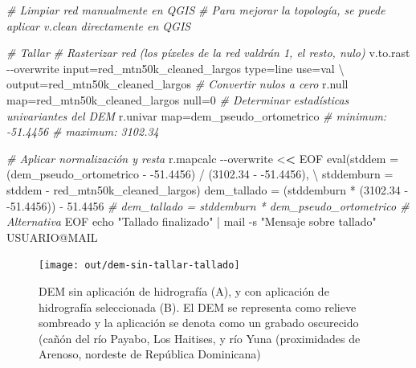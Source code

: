 \documentclass[spanish]{article}
\newenvironment{Shaded}{\begin{snugshade}}{\end{snugshade}}
\newcommand{\AttributeTok}[1]{\textcolor[rgb]{0.77,0.63,0.00}{#1}}
\newcommand{\CommentTok}[1]{\textcolor[rgb]{0.56,0.35,0.01}{\textit{#1}}}
\newcommand{\DecValTok}[1]{\textcolor[rgb]{0.00,0.00,0.81}{#1}}
\newcommand{\ErrorTok}[1]{\textcolor[rgb]{0.64,0.00,0.00}{\textbf{#1}}}
\newcommand{\FloatTok}[1]{\textcolor[rgb]{0.00,0.00,0.81}{#1}}
\newcommand{\FunctionTok}[1]{\textcolor[rgb]{0.00,0.00,0.00}{#1}}
\newcommand{\NormalTok}[1]{#1}
\newcommand{\OtherTok}[1]{\textcolor[rgb]{0.56,0.35,0.01}{#1}}
\newcommand{\SpecialCharTok}[1]{\textcolor[rgb]{0.00,0.00,0.00}{#1}}
\newcommand{\StringTok}[1]{\textcolor[rgb]{0.31,0.60,0.02}{#1}}
\begin{document}
\begin{Shaded}
\begin{Highlighting}[]
\CommentTok{\# Limpiar red manualmente en QGIS}
\CommentTok{\# Para mejorar la topología, se puede aplicar v.clean directamente en QGIS}

\CommentTok{\# Tallar}
\CommentTok{\# Rasterizar red (los píxeles de la red valdrán 1, el resto, nulo)}
\NormalTok{v.to.rast }\SpecialCharTok{{-}{-}}\NormalTok{overwrite input}\OtherTok{=}\NormalTok{red\_mtn50k\_cleaned\_largos type}\OtherTok{=}\NormalTok{line use}\OtherTok{=}\NormalTok{val \textbackslash{}}
\NormalTok{  output}\OtherTok{=}\NormalTok{red\_mtn50k\_cleaned\_largos}
\CommentTok{\# Convertir nulos a cero}
\NormalTok{r.null map}\OtherTok{=}\NormalTok{red\_mtn50k\_cleaned\_largos null}\OtherTok{=}\DecValTok{0}
\CommentTok{\# Determinar estadísticas univariantes del DEM}
\NormalTok{r.univar map}\OtherTok{=}\NormalTok{dem\_pseudo\_ortometrico}
\CommentTok{\# minimum: {-}51.4456}
\CommentTok{\# maximum: 3102.34}

\CommentTok{\# Aplicar normalización y resta}
\NormalTok{r.mapcalc }\SpecialCharTok{{-}{-}}\NormalTok{overwrite }\SpecialCharTok{\textless{}}\ErrorTok{\textless{}}\NormalTok{ EOF}
\FunctionTok{eval}\NormalTok{(}\AttributeTok{stddem =}\NormalTok{ (dem\_pseudo\_ortometrico }\SpecialCharTok{{-}} \SpecialCharTok{{-}}\FloatTok{51.4456}\NormalTok{) }\SpecialCharTok{/}\NormalTok{ (}\FloatTok{3102.34} \SpecialCharTok{{-}} \SpecialCharTok{{-}}\FloatTok{51.4456}\NormalTok{), }\SpecialCharTok{\textbackslash{}}
     \AttributeTok{stddemburn =}\NormalTok{ stddem }\SpecialCharTok{{-}}\NormalTok{ red\_mtn50k\_cleaned\_largos)}
\NormalTok{dem\_tallado }\OtherTok{=}\NormalTok{ (stddemburn }\SpecialCharTok{*}\NormalTok{ (}\FloatTok{3102.34} \SpecialCharTok{{-}} \SpecialCharTok{{-}}\FloatTok{51.4456}\NormalTok{)) }\SpecialCharTok{{-}} \FloatTok{51.4456}
\CommentTok{\# dem\_tallado = stddemburn * dem\_pseudo\_ortometrico \# Alternativa}
\NormalTok{EOF}
\NormalTok{echo }\StringTok{"Tallado finalizado"} \SpecialCharTok{|}\NormalTok{ mail }\SpecialCharTok{{-}}\NormalTok{s }\StringTok{"Mensaje sobre tallado"}\NormalTok{ USUARIO}\SpecialCharTok{@}\NormalTok{MAIL}
\end{Highlighting}
\end{Shaded}

\begin{figure}

{\centering \texttt{[image: out/dem-sin-tallar-tallado]} 

}

\caption{DEM sin aplicación de hidrografía (A), y con aplicación de hidrografía seleccionada (B). El DEM se representa como relieve sombreado y la aplicación se denota como un grabado oscurecido (cañón del río Payabo, Los Haitises, y río Yuna (proximidades de Arenoso, nordeste de República Dominicana)}\label{fig:demtallado}
\end{figure}
\end{document}
